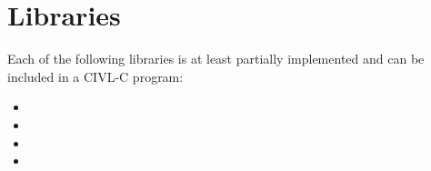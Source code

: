 






\chapter{Libraries}

Each of the following libraries is at least partially implemented and can
be included in a CIVL-C program:
\begin{itemize}
\item {}
\item {}
\item {}
\item {}
\end{itemize}

